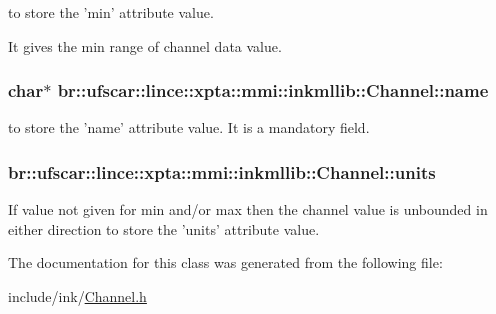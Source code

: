 to store the 'min' attribute value. 

It gives the min range of channel data value. \hypertarget{classbr_1_1ufscar_1_1lince_1_1xpta_1_1mmi_1_1inkmllib_1_1Channel_afb61ee0d3d7834733557c09adf3b6bcb}{
\subsubsection[{name}]{\setlength{\rightskip}{0pt plus 5cm}char$\ast$ {\bf br::ufscar::lince::xpta::mmi::inkmllib::Channel::name}}}
\label{classbr_1_1ufscar_1_1lince_1_1xpta_1_1mmi_1_1inkmllib_1_1Channel_afb61ee0d3d7834733557c09adf3b6bcb}


to store the 'name' attribute value. It is a mandatory field. 

\hypertarget{classbr_1_1ufscar_1_1lince_1_1xpta_1_1mmi_1_1inkmllib_1_1Channel_ade05efe4076717c540529d5b82c81183}{
\subsubsection[{units}]{ {\bf br::ufscar::lince::xpta::mmi::inkmllib::Channel::units}}}
\label{classbr_1_1ufscar_1_1lince_1_1xpta_1_1mmi_1_1inkmllib_1_1Channel_ade05efe4076717c540529d5b82c81183}


If value not given for min and/or max then the channel value is unbounded in either direction to store the 'units' attribute value. 



The documentation for this class was generated from the following file:\begin{DoxyCompactItemize}
\item 
include/ink/\hyperlink{Channel_8h}{Channel.h}\end{DoxyCompactItemize}
